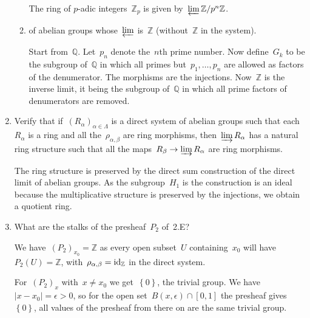 \documentclass[a4paper,11pt,oneside,openany,article]{memoir}
\begin{document}
\begin{enumerate}
\begin{enumerate}
        \begin{solution}
          The ring of $p$\nobreakdash-adic integers~$\mathbb{Z}_p$ is given by~$\varprojlim\mathbb{Z}/p^n\mathbb{Z}$.
        \end{solution}

      \item of abelian groups whose~$\varprojlim$ is~$\mathbb{Z}$ (without~$\mathbb{Z}$ in the system).

        \begin{solution}
          Start from~$\mathbb{Q}$. Let~$p_n$ denote the~$n$th prime number. Now define~$G_k$ to be the subgroup of~$\mathbb{Q}$ in which all primes but~$p_1,\ldots,p_n$ are allowed as factors of the denumerator. The morphisms are the injections. Now~$\mathbb{Z}$ is the inverse limit, it being the subgroup of~$\mathbb{Q}$ in which all prime factors of denumerators are removed.
        \end{solution}
    \end{enumerate}

  \item Verify that if~$(R_\alpha)_{\alpha\in\Lambda}$ is a direct system of abelian groups such that each~$R_\alpha$ is a ring and all the~$\rho_{\alpha,\beta}$ are ring morphisms, then~$\varinjlim R_\alpha$ has a natural ring structure such that all the maps~$R_\beta\to\varinjlim R_\alpha$ are ring morphisms.

    \begin{solution}
      The ring structure is preserved by the direct sum construction of the direct limit of abelian groups. As the subgroup~$H_1$ is the construction is an ideal because the multiplicative structure is preserved by the injections, we obtain a quotient ring.
    \end{solution}

  \item What are the stalks of the presheaf~$P_2$ of~2.E?

    \begin{solution}
      We have~$(P_2)_{x_0}=\mathbb{Z}$ as every open subset~$U$ containing~$x_0$ will have~$P_2(U)=\mathbb{Z}$, with~$\rho_{\alpha,\beta}=\operatorname{id}_{\mathbb{Z}}$ in the direct system.

      For~$(P_2)_{x}$ with~$x\neq x_0$ we get~$\left\{ 0 \right\}$, the trivial group. We have~$|x-x_0|=\epsilon>0$, so for the open set~$B(x,\epsilon)\cap[0,1]$ the presheaf gives~$\left\{ 0 \right\}$, all values of the presheaf from there on are the same trivial group.
    \end{solution}


\end{enumerate}
\end{document}
